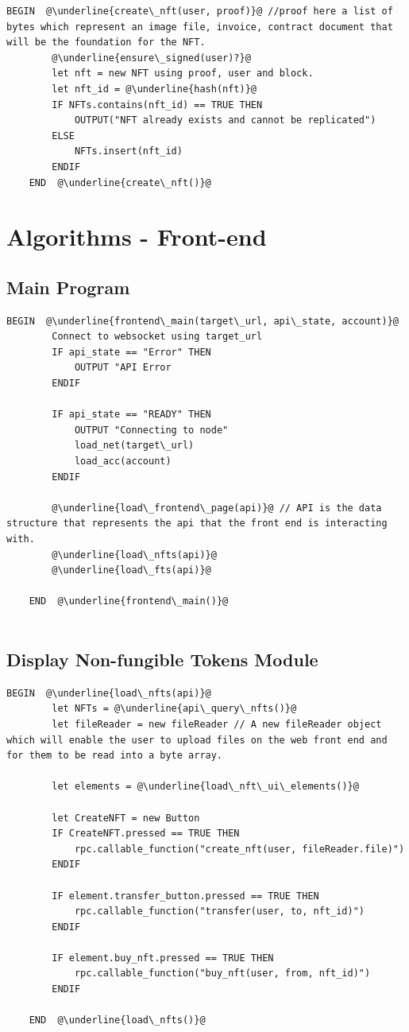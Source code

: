 \begin{lstlisting}[caption=Create NFT, escapechar=\@]
	BEGIN  @\underline{create\_nft(user, proof)}@ //proof here a list of bytes which represent an image file, invoice, contract document that will be the foundation for the NFT.
		@\underline{ensure\_signed(user)?}@	
		let nft = new NFT using proof, user and block.
		let nft_id = @\underline{hash(nft)}@
		IF NFTs.contains(nft_id) == TRUE THEN
			OUTPUT("NFT already exists and cannot be replicated")
		ELSE
			NFTs.insert(nft_id)
		ENDIF
	END  @\underline{create\_nft()}@
\end{lstlisting}

\section{Algorithms - Front-end}

\subsection{Main Program}

\begin{lstlisting}[caption=Main Program, escapechar=\@]
	BEGIN  @\underline{frontend\_main(target\_url, api\_state, account)}@
		Connect to websocket using target_url
		IF api_state == "Error" THEN
			OUTPUT "API Error
		ENDIF

		IF api_state == "READY" THEN
			OUTPUT "Connecting to node"
			load_net(target\_url)
			load_acc(account)
		ENDIF

		@\underline{load\_frontend\_page(api)}@ // API is the data structure that represents the api that the front end is interacting with.
		@\underline{load\_nfts(api)}@
		@\underline{load\_fts(api)}@

	END  @\underline{frontend\_main()}@
			
\end{lstlisting}
\subsection{Display Non-fungible Tokens Module}

\begin{lstlisting}[caption=Load NFTs, escapechar=\@]
	BEGIN  @\underline{load\_nfts(api)}@
		let NFTs = @\underline{api\_query\_nfts()}@
		let fileReader = new fileReader // A new fileReader object which will enable the user to upload files on the web front end and for them to be read into a byte array.

		let elements = @\underline{load\_nft\_ui\_elements()}@

		let CreateNFT = new Button
		IF CreateNFT.pressed == TRUE THEN
			rpc.callable_function("create_nft(user, fileReader.file)")
		ENDIF

		IF element.transfer_button.pressed == TRUE THEN
			rpc.callable_function("transfer(user, to, nft_id)")
		ENDIF

		IF element.buy_nft.pressed == TRUE THEN
			rpc.callable_function("buy_nft(user, from, nft_id)")
		ENDIF

	END  @\underline{load\_nfts()}@
\end{lstlisting}


\vfill{}
